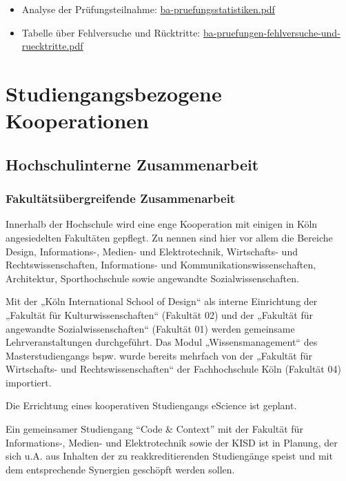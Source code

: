 \begin{itemize}
\tightlist
\item
  Analyse der Prüfungsteilnahme:
  \href{../anhaenge/ba-pruefungsplan_mi.pdf}{ba-pruefungsstatistiken.pdf}
\item
  Tabelle über Fehlversuche und Rücktritte:
  \href{../anhaenge/ba-pruefungen-fehlversuche-und-ruecktritte.pdf}{ba-pruefungen-fehlversuche-und-ruecktritte.pdf}
\end{itemize}

\chapter{Studiengangsbezogene
Kooperationen}\label{studiengangsbezogene-kooperationen}

\section{Hochschulinterne
Zusammenarbeit}\label{hochschulinterne-zusammenarbeit}

\subsection{Fakultätsübergreifende
Zusammenarbeit}\label{fakultuxe4tsuxfcbergreifende-zusammenarbeit}

Innerhalb der Hochschule wird eine enge Kooperation mit einigen in Köln
angesiedelten Fakultäten gepflegt. Zu nennen sind hier vor allem die
Bereiche Design, Informations-, Medien- und Elektrotechnik, Wirtschafts-
und Rechtswissenschaften, Informations- und
Kommunikationswissenschaften, Architektur, Sporthochschule sowie
angewandte Sozialwissenschaften.

Mit der „Köln International School of Design`` als interne Einrichtung
der „Fakultät für Kulturwissenschaften`` (Fakultät 02) und der „Fakultät
für angewandte Sozialwissenschaften`` (Fakultät 01) werden gemeinsame
Lehrveranstaltungen durchgeführt. Das Modul „Wissensmanagement`` des
Masterstudiengangs bspw. wurde bereits mehrfach von der „Fakultät für
Wirtschafts- und Rechtswissenschaften`` der Fachhochschule Köln
(Fakultät 04) importiert.

Die Errichtung eines kooperativen Studiengangs eScience ist geplant.

Ein gemeinsamer Studiengang ``Code \& Context'' mit der Fakultät für
Informations-, Medien- und Elektrotechnik sowie der KISD ist in Planung,
der sich u.A. aus Inhalten der zu reakkreditierenden Studiengänge speist
und mit dem entsprechende Synergien geschöpft werden sollen.

